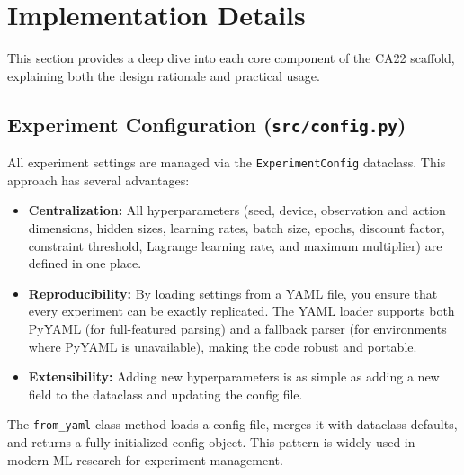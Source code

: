 \documentclass[11pt]{article}
\begin{document}
\section{Implementation Details}
This section provides a deep dive into each core component of the CA22 scaffold, explaining both the design rationale and practical usage.

\subsection{Experiment Configuration (\texttt{src/config.py})}
All experiment settings are managed via the \texttt{ExperimentConfig} dataclass. This approach has several advantages:
\begin{itemize}
  \item \textbf{Centralization:} All hyperparameters (seed, device, observation and action dimensions, hidden sizes, learning rates, batch size, epochs, discount factor, constraint threshold, Lagrange learning rate, and maximum multiplier) are defined in one place.
  \item \textbf{Reproducibility:} By loading settings from a YAML file, you ensure that every experiment can be exactly replicated. The YAML loader supports both PyYAML (for full-featured parsing) and a fallback parser (for environments where PyYAML is unavailable), making the code robust and portable.
  \item \textbf{Extensibility:} Adding new hyperparameters is as simple as adding a new field to the dataclass and updating the config file.
\end{itemize}
The \texttt{from\_yaml} class method loads a config file, merges it with dataclass defaults, and returns a fully initialized config object. This pattern is widely used in modern ML research for experiment management.
\end{document}
